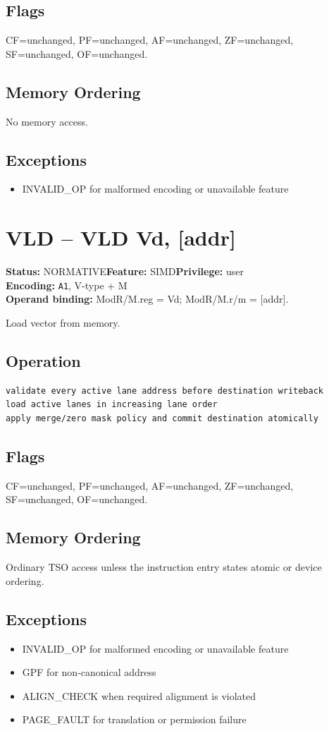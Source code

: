 \documentclass[10pt]{article}
\begin{document}
\subsection*{Flags}
CF=unchanged, PF=unchanged, AF=unchanged, ZF=unchanged, SF=unchanged, OF=unchanged.
\subsection*{Memory Ordering}
No memory access.
\subsection*{Exceptions}
\begin{itemize}
\item INVALID\_OP for malformed encoding or unavailable feature
\end{itemize}
\clearpage

\section{VLD -- VLD Vd, [addr]}
\textbf{Status:} NORMATIVE\quad \textbf{Feature:} SIMD\quad \textbf{Privilege:} user\\
\textbf{Encoding:} \texttt{A1}, V-type + M\\
\textbf{Operand binding:} ModR/M.reg = Vd; ModR/M.r/m = [addr].

Load vector from memory.

\subsection*{Operation}
\begin{lstlisting}
validate every active lane address before destination writeback
load active lanes in increasing lane order
apply merge/zero mask policy and commit destination atomically
\end{lstlisting}
\subsection*{Flags}
CF=unchanged, PF=unchanged, AF=unchanged, ZF=unchanged, SF=unchanged, OF=unchanged.
\subsection*{Memory Ordering}
Ordinary TSO access unless the instruction entry states atomic or device ordering.
\subsection*{Exceptions}
\begin{itemize}
\item INVALID\_OP for malformed encoding or unavailable feature
\item GPF for non-canonical address
\item ALIGN\_CHECK when required alignment is violated
\item PAGE\_FAULT for translation or permission failure
\end{itemize}
\clearpage
\end{document}

